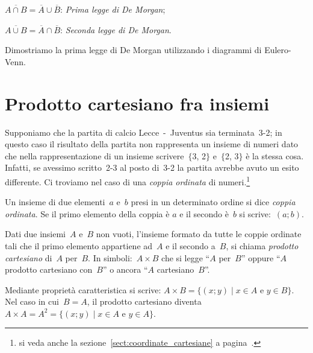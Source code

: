 \begin{enumeratea}
\item $\overline{A\cap B}=\overline{A}\cup \overline{B}$: \emph{Prima legge di De Morgan};
\item $\overline{A\cup B}=\overline{A}\cap \overline{B}$: \emph{Seconda legge di De Morgan}.
\end{enumeratea}

Dimostriamo la prima legge di De Morgan utilizzando i diagrammi di Eulero-Venn.
\begin{center}
 
\end{center}

\ovalbox{\risolvi \ref{ese:7.18}}

\section{Prodotto cartesiano fra insiemi}

Supponiamo che la partita di calcio Lecce~-~Juventus sia terminata~3-2; in questo caso il risultato della partita
non rappresenta un insieme di numeri dato che nella rappresentazione di un insieme scrivere~$\{$3, 2$\}$ e~$\{$2, 3$\}$
 è la stessa cosa. Infatti, se avessimo scritto~2-3 al posto di~3-2 la partita avrebbe avuto un esito
differente. Ci troviamo nel caso di una \emph{coppia ordinata} di numeri.\footnote{si veda anche la sezione~\ref{sect:coordinate_cartesiane} a pagina~\pageref{sect:coordinate_cartesiane}.}

\begin{definizione}
Un insieme di due elementi~$a$ e~$b$
presi in un determinato ordine si dice \emph{coppia ordinata}. Se il primo elemento della coppia è
$a$ e il secondo è~$b$ si scrive:~$(a;b)$.
\end{definizione}

\begin{definizione}
Dati due insiemi~$A$ e~$B$ non vuoti,
l'insieme formato da tutte le coppie ordinate tali che
il primo elemento appartiene ad~$A$ e il secondo a~$B$, si chiama
\emph{prodotto cartesiano} di~$A$ per~$B$. In simboli:~$A\times B$ che si legge ``$A$ per~$B$''
oppure ``$A$ prodotto cartesiano con~$B$'' o ancora ``$A$ cartesiano~$B$''.
\end{definizione}

Mediante proprietà caratteristica si scrive:
$A\times B=\{(x;y)\mid x\in A\text{ e }y\in B\}$.
Nel caso in cui~$B=A$, il prodotto cartesiano diventa $A\times A=A^{2}=\{(x;y)\mid x\in A\text{ e }y\in A\}$.

